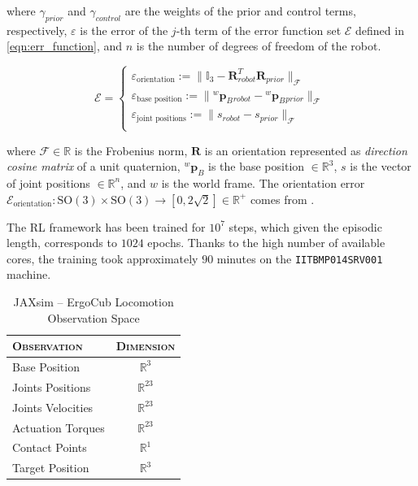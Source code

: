 where $\gamma _{prior}$ and $\gamma _{control}$ are the weights of the prior and control terms, respectively, $\varepsilon$ is the error of the $j$-th term of the error function set $\mathcal{E}$ defined in \cref{eqn:err_function}, and $n$ is the number of degrees of freedom of the robot.

\begin{equation}[right=\empheqrbrace{}]
    \label{eqn:err_function}
    \mathcal{E} =
    \begin{cases}
        \varepsilon _{\text{orientation}}    := \lVert \mathbb{I}_3 - \mathbf{R}_{robot}^T \mathbf{R}_{prior}  \rVert _{\mathcal{F}}        \\
        \varepsilon _{\text{base position}}  := \lVert {}^w \mathbf{p}_B {} _{robot} - {}^w  \mathbf{p}_B {}_{prior}  \rVert _{\mathcal{F}} \\
        \varepsilon _{\text{joint positions}}:= \lVert s _{robot} - s _{prior}  \rVert _{\mathcal{F}}                                       \\
    \end{cases}
\end{equation}

where $\mathcal{F} \in \mathbb{R}$ is the Frobenius norm, $\mathbf{R}$ is an orientation represented as \textit{direction cosine matrix} of a unit quaternion, ${}^w \mathbf{p}_B$ is the base position $\in \mathbb{R} ^3$, $s$ is the vector of joint positions $\in \mathbb{R} ^{n}$, and $w$ is the world frame.
The orientation error $\mathcal{E} _{\text{orientation}} : \mathrm{SO}(3) \times \mathrm{SO}(3) \rightarrow [0, 2\sqrt{2}] \in \mathbb{R} ^+$ comes from \citep{huynh_metrics_2009}.

The \ac{RL} framework has been trained for $10^7$ steps, which given the episodic length, corresponds to $1024$ epochs. Thanks to the high number of available cores, the training took approximately $90$ minutes on the \texttt{IITBMP014SRV001} machine.

\begin{table}
    \centering
    \label{tab:walkingobs_jaxsim}
    \begin{tabular}{l c}
        \toprule
        \textsc{Observation} & \textsc{Dimension} \\
        \midrule
        Base Position        & $\mathbb{R} ^{3}$  \\
        Joints Positions     & $\mathbb{R} ^{23}$ \\
        Joints Velocities    & $\mathbb{R} ^{23}$ \\
        Actuation Torques    & $\mathbb{R} ^{23}$ \\
        Contact Points       & $\mathbb{R} ^{1}$  \\
        Target Position      & $\mathbb{R} ^{3}$  \\
        \bottomrule
    \end{tabular}
    \caption{JAXsim -- ErgoCub Locomotion Observation Space}
\end{table}

